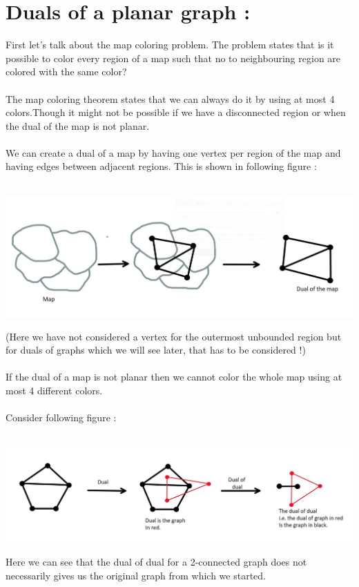 \documentclass{article}
\begin{document}
    \section*{Duals of a planar graph : }
    First let's talk about the map coloring problem. The problem states that is it possible to color every region of a map such that no to neighbouring region are colored with the same color?
    \\\\
    The map coloring theorem states that we can always do it by using at most 4 colors.Though it might not be possible if we have a disconnected region or when the dual of the map is not planar. 
    \\\\
    We can create a dual of a map by having one vertex per region of the map and having edges between adjacent regions. This is shown in following figure  :
    \\\\
    \centerline{\includegraphics[width=6in]{Images/map_coloring.JPG}}
    (Here we have not considered a vertex for the outermost unbounded region but for duals of graphs which we will see later, that has to be considered !)
    \\\\
    If the dual of a map is not planar then we cannot color the whole map using at most 4 different colors.
    \\\\
    Consider following figure : 
    \\\\
    \centerline{\includegraphics[width=6in]{Images/dual_1.JPG}}
    Here we can see that the dual of dual for a 2-connected graph does not necessarily gives us the original graph from which we started.
\end{document}
